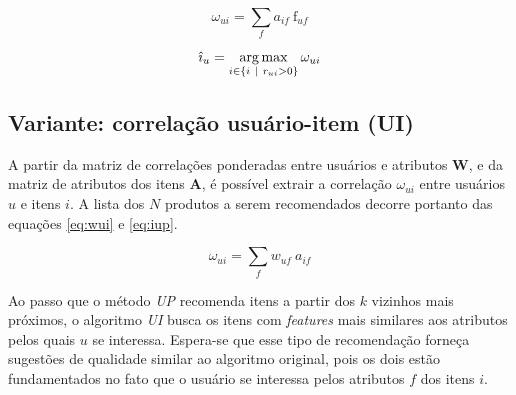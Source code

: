 \begin{equation}
\label{eq:wi} 
    \omega_{ui} = \sum_{f}{a_{if}~\mathrm{f}_{uf}}
\end{equation} 

\begin{equation}
\label{eq:iup} 
    \hat{\imath}_u = \operatorname*{arg\,max}_{i \in \left\{i~|~r_{ui} > 0\right\}}{\omega_{ui}}
\end{equation} 

\subsection{Variante: correlação usuário-item (UI)} %
\label{sub:variante_correla_o_usu_rio_item_}

A partir da matriz de correlações ponderadas entre usuários e atributos $\mathbf{W}$, e da matriz de atributos dos itens $\mathbf{A}$, é possível extrair a correlação $\omega_{ui}$ entre usuários $u$ e itens $i$. A lista dos $N$ produtos a serem recomendados decorre portanto das equações \ref{eq:wui} e \ref{eq:iup}.

\begin{equation}
\label{eq:wui} 
    \omega_{ui} = \sum_{f}{w_{uf}~a_{if}}
\end{equation} 

Ao passo que o método \textit{UP} recomenda itens a partir dos $k$ vizinhos mais próximos, o algoritmo \textit{UI} busca os itens com \textit{features} mais similares aos atributos pelos quais $u$ se interessa. Espera-se que esse tipo de recomendação forneça sugestões de qualidade similar ao algoritmo original, pois os dois estão fundamentados no fato que o usuário se interessa pelos atributos $f$ dos itens $i$. 


